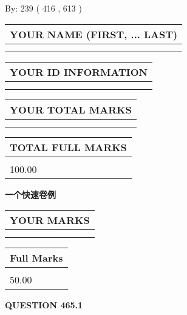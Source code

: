 \documentclass{ctexart}
\begin{document}
   
\hspace{1.0in} By: 
 239 ( 416 ,  613 )
   
   
   
   
\newpage 
\setcounter{page}{ 
   465001 } 
   
   
   
   
\noindent\begin{tabular}{|l|}
\hline
YOUR NAME (FIRST, ... LAST)  \\
\hline
 \\ 
 \\ 
\hline
\end{tabular}
\hspace{0.05in} \begin{tabular}{|l|}
\hline
 YOUR   ID   INFORMATION  \\
\hline
 \\ 
 \\ 
\hline
\end{tabular}
   
   
\vspace{0.2in}\noindent\begin{tabular}{|l|}
\hline
YOUR TOTAL MARKS  \\
\hline
 \\ 
 \\ 
\hline
\end{tabular}
\hspace{0.05in} \begin{tabular}{|l|}
\hline
TOTAL FULL MARKS  \\
\hline
 \\ 
100.00 \\
\hline
\end{tabular}
   
   
 \vspace{0.2in}
{\LARGE {\textbf{ 一个快速卷例}}}
   
   
  
\vspace{0.2in}
  
\noindent\begin{tabular}{|l|}
\hline
 YOUR MARKS  \\
\hline
 \\ 
 \\ 
\hline
\end{tabular}
\hspace{0.05in} \begin{tabular}{|l|}
\hline
 Full Marks  \\
\hline
 \\ 
50.00 \\
\hline
\end{tabular}
{\textbf{\Large{QUESTION
465.1 
}}}
  
\end{document}
